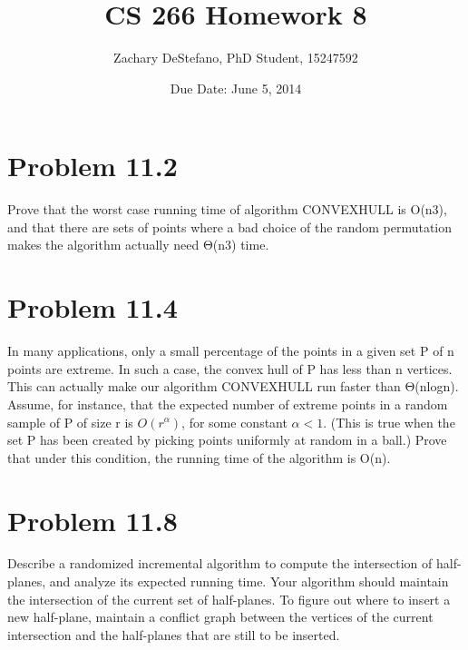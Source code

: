 \documentclass[11pt,psfig]{article}
\begin{document}
\setlength{\parskip}{1.2ex plus0.3ex minus 0.3ex}


\thispagestyle{empty} \pagestyle{myheadings} 



\title{CS 266 Homework 8}
\author{Zachary DeStefano, PhD Student, 15247592}
\date{Due Date: June 5, 2014}

\maketitle

\vfill\eject

\section*{Problem 11.2}

Prove that the worst case running time of algorithm CONVEXHULL is
O(n3), and that there are sets of points where a bad choice of the random
permutation makes the algorithm actually need Θ(n3) time.


\section*{Problem 11.4}

In many applications, only a small percentage of the points in a given set
P of n points are extreme. In such a case, the convex hull of P has less
than n vertices. This can actually make our algorithm CONVEXHULL
run faster than Θ(nlogn).\\

Assume, for instance, that the expected number of extreme points in a
random sample of P of size r is $O(r^\alpha)$, for some constant $\alpha < 1$. (This
is true when the set P has been created by picking points uniformly at
random in a ball.) Prove that under this condition, the running time of
the algorithm is O(n).

\section*{Problem 11.8}

Describe a randomized incremental algorithm to compute the intersection
of half-planes, and analyze its expected running time. Your algorithm
should maintain the intersection of the current set of half-planes.
To figure out where to insert a new half-plane, maintain a conflict graph
between the vertices of the current intersection and the half-planes that
are still to be inserted.
\end{document}
